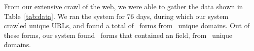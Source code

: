 From our extensive crawl of the web, we were able to gather the data
shown in Table~\ref{tab:data}. We ran the system for 76 days, during which our system crawled \urls unique URLs,
and found a total of \forms\ forms from \uniqueforms\ unique domains. Out of these forms, our system
found \emailforms\ forms that contained an \email field, from \uniqueemailforms\ unique domains.



